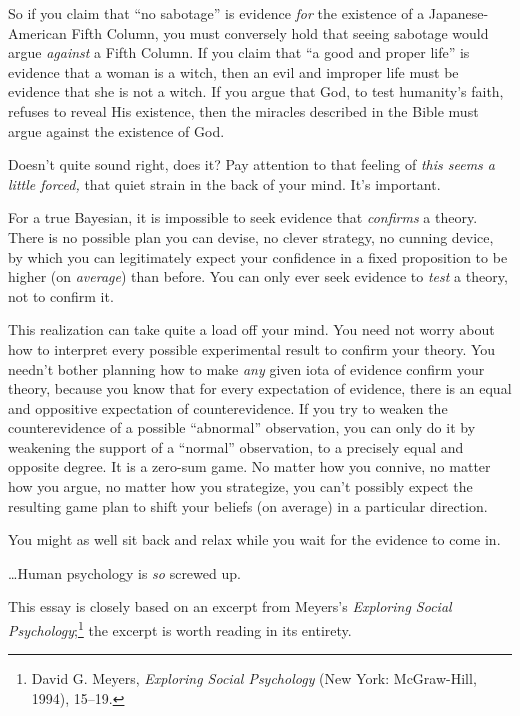 {
 So if you claim that ``no
sabotage'' is evidence \textit{for} the existence of
a Japanese-American Fifth Column, you must conversely hold that seeing
sabotage would argue \textit{against} a Fifth Column. If you claim that
``a good and proper life'' is
evidence that a woman is a witch, then an evil and improper life must
be evidence that she is not a witch. If you argue that God, to test
humanity's faith, refuses to reveal His existence, then
the miracles described in the Bible must argue against the existence of
God.}

{
 Doesn't quite sound right, does it? Pay attention
to that feeling of \textit{this seems a little forced,} that quiet
strain in the back of your mind. It's important.}

{
 For a true Bayesian, it is impossible to seek evidence that
\textit{confirms} a theory. There is no possible plan you can devise,
no clever strategy, no cunning device, by which you can legitimately
expect your confidence in a fixed proposition to be higher (on
\textit{average}) than before. You can only ever seek evidence to
\textit{test} a theory, not to confirm it.}

{
 This realization can take quite a load off your mind. You need not
worry about how to interpret every possible experimental result to
confirm your theory. You needn't bother planning how to
make \textit{any} given iota of evidence confirm your theory, because
you know that for every expectation of evidence, there is an equal and
oppositive expectation of counterevidence. If you try to weaken the
counterevidence of a possible
``abnormal'' observation, you can
only do it by weakening the support of a
``normal'' observation, to a
precisely equal and opposite degree. It is a zero-sum game. No matter
how you connive, no matter how you argue, no matter how you strategize,
you can't possibly expect the resulting game plan to
shift your beliefs (on average) in a particular direction.}

{
 You might as well sit back and relax while you wait for the
evidence to come in.}

{
 \ldots Human psychology is \textit{so} screwed up.}

\myendsectiontext


{
 This essay is closely based on an excerpt from
Meyers's \textit{Exploring Social
Psychology};\footnote{David G. Meyers, \textit{Exploring Social Psychology} (New
York: McGraw-Hill, 1994), 15--19.} the excerpt is worth reading in its
entirety. }

